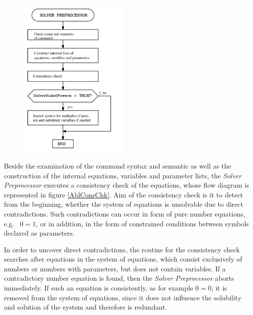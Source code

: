 \begin {figure} [htbp]
\begin {center}
\includegraphics[height=8cm]{PreprocEn.png}
\caption {}
\end {center}
\end {figure}


Beside the examination of the command syntax and semantic as well as the construction of the internal equations, variables and parameter lists,  the {\em Solver Preprocessor} executes a consistency check of the equations, whose flow diagram is represented in figure \ref{AblConsChk}. Aim of the consistency check is it to detect from the beginning, whether the system of equations is unsolvable due to direct contradictions. Such contradictions can occur in form of pure number equations, e.g. \ $0=1$, or in addition, in the form of constrained  conditions between symbols declared as parameters.

In order to uncover direct contradictions, the routine for the consistency check searches after equations in the system of equations, which consist exclusively of numbers  or numbers with parameters, but does not contain variables.  If a contradictory number equation is found, then the  {\em Solver Preprocessor}  aborts immediately. If such an equation is  consistently, as for example $0=0$, it is removed from the system of equations, since it does not influence the solubility and solution of the system  and therefore is redundant.

